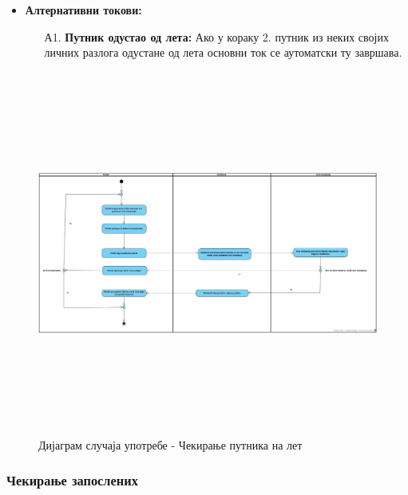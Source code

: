 \documentclass{article}
\begin{document}
\begin{itemize}
    \item \textbf{Алтернативни токови:}
    \begin{itemize}
        \item[А1.] \textbf{Путник одустао од лета:} Ако у кораку 2. путник из неких својих личних разлога одустане од лета основни ток се аутоматски ту завршава.
    \end{itemize}
   
\end{itemize}

\begin{figure}[H]
    \centering
    \includegraphics[width=1.1\textwidth, height=12cm]{Dijagrami_slike/cekiranje_putnika.jpg}
    \caption{Дијаграм случаја употребе - Чекирање путника на лет}
\end{figure}

\newpage
\subsubsection{Чекирање запослених}
\end{document}
